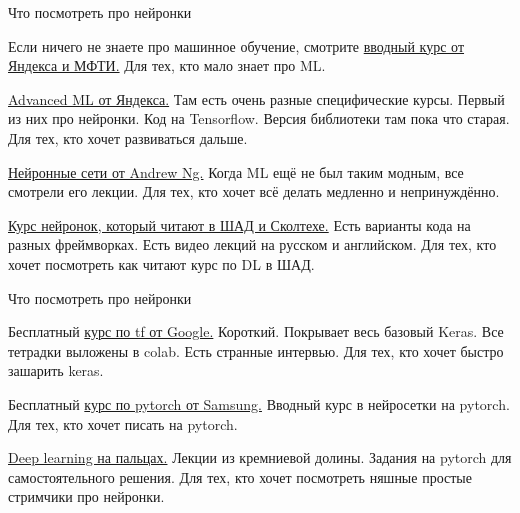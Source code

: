 \documentclass[notes,12pt, aspectratio=169]{beamer}
\newenvironment{wideitemize}{\itemize\addtolength{\itemsep}{10pt}}{\enditemize}
\begin{document}
\begin{frame}{Что посмотреть  про нейронки}
\begin{wideitemize} 
\item Если ничего не знаете про машинное обучение, смотрите \href{https://www.coursera.org/specializations/machine-learning-data-analysis}{вводный курс от Яндекса и МФТИ.} \alert{Для тех, кто мало знает про ML.}

\item  \href{https://www.coursera.org/specializations/aml}{Advanced ML от Яндекса.} Там есть очень разные специфические курсы. Первый из них про нейронки. Код на Tensorflow. Версия библиотеки там пока что старая.  \alert{Для тех, кто хочет развиваться дальше.}

\item  \href{https://www.coursera.org/specializations/deep-learning} {Нейронные сети от Andrew Ng.} Когда ML ещё не был таким модным, все смотрели его лекции. \alert{Для тех, кто хочет всё делать медленно и непринуждённо.}

\item  \href{https://github.com/yandexdataschool/Practical_DL/tree/master}{Курс нейронок, который читают в ШАД и Сколтехе.} Есть варианты кода на разных фреймворках. Есть видео лекций на русском и английском. \alert{Для тех, кто хочет посмотреть как читают курс по DL  в ШАД.}
\end{wideitemize} 
\end{frame} 


\begin{frame}{Что посмотреть  про нейронки}
\begin{wideitemize} 
	
	\item Бесплатный \href{https://www.udacity.com/course/intro-to-tensorflow-for-deep-learning--ud187}{курс по tf от Google.} Короткий. Покрывает весь базовый Keras. Все тетрадки выложены в colab. Есть странные интервью.  \alert{Для тех, кто  хочет быстро зашарить keras.}
	
	\item Бесплатный \href{https://stepik.org/course/50352/syllabus}{курс по pytorch от Samsung.}  Вводный курс в нейросетки на pytorch. \alert{Для тех, кто  хочет писать на pytorch.}
	
	\item  \href{https://dlcourse.ai}{Deep learning на пальцах.} Лекции из кремниевой долины. Задания на pytorch для самостоятельного решения.   \alert{Для тех, кто  хочет посмотреть няшные простые стримчики про нейронки.}
	
\end{wideitemize} 
\end{frame} 
\end{document}
